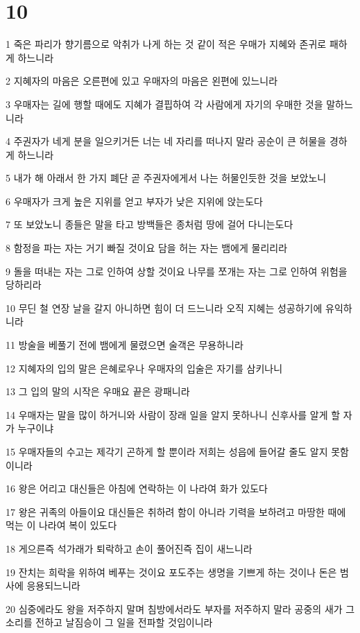 \chapter{10}

\par 1 죽은 파리가 향기름으로 악취가 나게 하는 것 같이 적은 우매가 지혜와 존귀로 패하게 하느니라
\par 2 지혜자의 마음은 오른편에 있고 우매자의 마음은 왼편에 있느니라
\par 3 우매자는 길에 행할 때에도 지혜가 결핍하여 각 사람에게 자기의 우매한 것을 말하느니라
\par 4 주권자가 네게 분을 일으키거든 너는 네 자리를 떠나지 말라 공순이 큰 허물을 경하게 하느니라
\par 5 내가 해 아래서 한 가지 폐단 곧 주권자에게서 나는 허물인듯한 것을 보았노니
\par 6 우매자가 크게 높은 지위를 얻고 부자가 낮은 지위에 앉는도다
\par 7 또 보았노니 종들은 말을 타고 방백들은 종처럼 땅에 걸어 다니는도다
\par 8 함정을 파는 자는 거기 빠질 것이요 담을 허는 자는 뱀에게 물리리라
\par 9 돌을 떠내는 자는 그로 인하여 상할 것이요 나무를 쪼개는 자는 그로 인하여 위험을 당하리라
\par 10 무딘 철 연장 날을 갈지 아니하면 힘이 더 드느니라 오직 지혜는 성공하기에 유익하니라
\par 11 방술을 베풀기 전에 뱀에게 물렸으면 술객은 무용하니라
\par 12 지혜자의 입의 말은 은혜로우나 우매자의 입술은 자기를 삼키나니
\par 13 그 입의 말의 시작은 우매요 끝은 광패니라
\par 14 우매자는 말을 많이 하거니와 사람이 장래 일을 알지 못하나니 신후사를 알게 할 자가 누구이냐
\par 15 우매자들의 수고는 제각기 곤하게 할 뿐이라 저희는 성읍에 들어갈 줄도 알지 못함이니라
\par 16 왕은 어리고 대신들은 아침에 연락하는 이 나라여 화가 있도다
\par 17 왕은 귀족의 아들이요 대신들은 취하려 함이 아니라 기력을 보하려고 마땅한 때에 먹는 이 나라여 복이 있도다
\par 18 게으른즉 석가래가 퇴락하고 손이 풀어진즉 집이 새느니라
\par 19 잔치는 희락을 위하여 베푸는 것이요 포도주는 생명을 기쁘게 하는 것이나 돈은 범사에 응용되느니라
\par 20 심중에라도 왕을 저주하지 말며 침방에서라도 부자를 저주하지 말라 공중의 새가 그 소리를 전하고 날짐승이 그 일을 전파할 것임이니라

